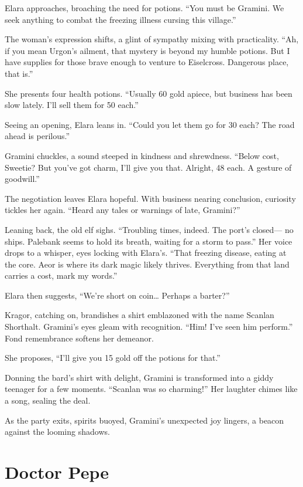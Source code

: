 \documentclass[
  letterpaper,12pt,twoside,twocolumn,openany,
  nodeprecatedcode,bg=full]{dndbook}
\begin{document}
Elara approaches, broaching the need for potions. ``You must be Gramini.
We seek anything to combat the freezing illness cursing this village.''

The woman's expression shifts, a glint of sympathy mixing with
practicality. ``Ah, if you mean Urgon's ailment, that mystery is beyond
my humble potions. But I have supplies for those brave enough to venture
to Eiselcross. Dangerous place, that is.''

She presents four health potions. ``Usually 60 gold apiece, but business
has been slow lately. I'll sell them for 50 each.''

Seeing an opening, Elara leans in. ``Could you let them go for 30 each?
The road ahead is perilous.''

Gramini chuckles, a sound steeped in kindness and shrewdness. ``Below
cost, Sweetie? But you've got charm, I'll give you that. Alright, 48
each. A gesture of goodwill.''

The negotiation leaves Elara hopeful. With business nearing conclusion,
curiosity tickles her again. ``Heard any tales or warnings of late,
Gramini?''

Leaning back, the old elf sighs. ``Troubling times, indeed. The port's
closed--- no ships. Palebank seems to hold its breath, waiting for a
storm to pass.'' Her voice drops to a whisper, eyes locking with
Elara's. ``That freezing disease, eating at the core. Aeor is where its
dark magic likely thrives. Everything from that land carries a cost,
mark my words.''

Elara then suggests, ``We're short on coin\ldots{} Perhaps a barter?''

Kragor, catching on, brandishes a shirt emblazoned with the name Scanlan
Shorthalt. Gramini's eyes gleam with recognition. ``Him! I've seen him
perform.'' Fond remembrance softens her demeanor.

She proposes, ``I'll give you 15 gold off the potions for that.''

Donning the bard's shirt with delight, Gramini is transformed into a
giddy teenager for a few moments. ``Scanlan was so charming!'' Her
laughter chimes like a song, sealing the deal.

As the party exits, spirits buoyed, Gramini's unexpected joy lingers, a
beacon against the looming shadows.

\section{Doctor Pepe}\label{doctor-pepe}
\end{document}
